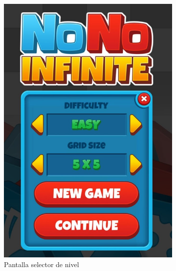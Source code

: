 \documentclass[11pt,spanish,listoffigures,listoftables]{tfgetsinf}
\begin{document}
\begin{figure}[h!]
   \centering
   \begin{subfigure}[b]{0.49\linewidth}
     \includegraphics[width=\linewidth]{images/infinite1.png}
     \caption{Pantalla selector de nivel}
     \label{fig:infinite1-1}
   \end{subfigure}
   \begin{subfigure}[b]{0.49\linewidth}

\end{subfigure}
\end{figure}
\end{document}
